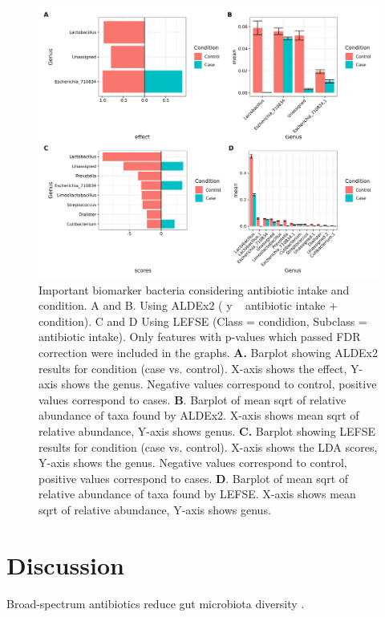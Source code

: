 \documentclass[biotech,article,submit,pdftex,moreauthors]{Definitions/mdpi}
\begin{document}
\begin{figure}[H]
    \centering
    \includegraphics[width = \textwidth]{figures/Differential.jpg}
    \caption{ Important biomarker bacteria considering antibiotic intake and condition. A and B. Using ALDEx2 ( y ~ antibiotic intake + condition). C and D Using LEFSE (Class = condidion, Subclass = antibiotic intake). Only features with p-values which passed FDR correction were included in the graphs. \textbf{A.} Barplot showing ALDEx2 results for condition (case vs. control). X-axis shows the effect, Y-axis shows the genus. Negative values correspond to control, positive values correspond to cases.
    \textbf{B}. Barplot of mean sqrt of relative abundance of taxa found by ALDEx2. X-axis shows mean sqrt of relative abundance, Y-axis shows genus. \textbf{C.} Barplot showing LEFSE results for condition (case vs. control). X-axis shows the LDA scores, Y-axis shows the genus. Negative values correspond to control, positive values correspond to cases. \textbf{D}. Barplot of mean sqrt of relative abundance of taxa found by LEFSE. X-axis shows mean sqrt of relative abundance, Y-axis shows genus.}
	\label{fig:differential}
    \end{figure}



\section{Discussion}

Broad-spectrum antibiotics reduce gut microbiota diversity \cite{@dubourgCulturomicsPyrosequencingEvidence2014}.
\end{document}
